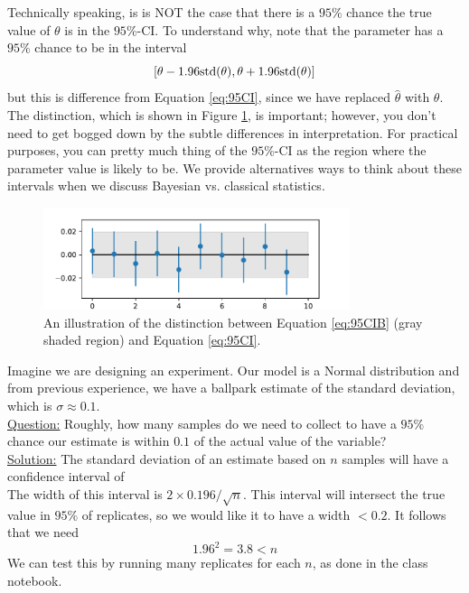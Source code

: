 Technically speaking, is is NOT the case that there is a $95\%$ chance the true value of $\theta$ is in the $95\%$-CI. 
To understand why, note that the parameter has a $95\%$ chance to be in the interval 
\begin{equation}\label{eq:95CIB}
[\theta - 1.96{\rm std}(\theta),\theta + 1.96{\rm std}(\theta)]
\end{equation}
but this is difference from Equation \ref{eq:95CI}, since we have replaced $\hat{\theta}$ with $\theta$. The distinction, which is shown in Figure \ref{fig:CI}, is important; however, you don't need to get bogged down by the subtle differences in interpretation. For practical purposes, you can pretty much thing of the $95\%$-CI as the region where the parameter value is likely to be. We provide alternatives ways to think about these intervals when we discuss Bayesian vs. classical statistics. 


\begin{figure}[h]
\centering
\includegraphics[width=0.8\textwidth]{./../figures/notes3CI}
\caption{An illustration of the distinction between Equation \ref{eq:95CIB} (gray shaded region) and Equation \ref{eq:95CI}.   }\label{fig:CI}
\end{figure}

\begin{example}[Estimating CI]
Imagine we are designing an experiment. Our model is a Normal distribution and from previous experience, we have a ballpark estimate of the standard deviation, which is $\sigma \approx 0.1$.  \\



\noindent
\underline{Question:} Roughly, how many samples do we need to collect to have a $95\%$ chance our estimate is within $0.1$ of the actual value of the variable?\\



\noindent
\underline{Solution:} The standard deviation of an estimate based on $n$ samples will have a confidence interval of 
\begin{equation*}
[\hat{\mu}-0.196/\sqrt{n},\hat{\mu} +  0.196/\sqrt{n}]
\end{equation*}
The width of this interval is $2 \times 0.196/\sqrt{n}$. This interval will intersect the true value in $95\%$ of replicates, so we would like it to have a width $<0.2$. It follows that we need 
\begin{equation*}
1.96^2 = 3.8 < n 
\end{equation*}
We can test this by running many replicates for each $n$, as done in the class notebook. 
\end{example}




